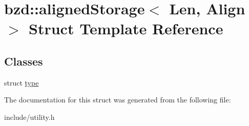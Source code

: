 \hypertarget{structbzd_1_1alignedStorage}{}\section{bzd\+:\+:aligned\+Storage$<$ Len, Align $>$ Struct Template Reference}
\label{structbzd_1_1alignedStorage}
\subsection*{Classes}
\begin{DoxyCompactItemize}
\item 
struct \hyperlink{structbzd_1_1alignedStorage_1_1type}{type}
\end{DoxyCompactItemize}


The documentation for this struct was generated from the following file\+:\begin{DoxyCompactItemize}
\item 
include/utility.\+h\end{DoxyCompactItemize}

